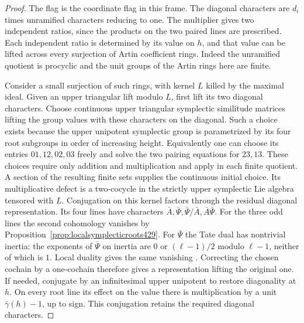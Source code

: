 \documentclass[a4paper,11pt]{article}
\theoremstyle{definition}
\theoremstyle{remark}
\numberwithin{equation}{section}
\begin{document}
\begin{proof}
The flag is the coordinate flag in this frame. The diagonal
characters are \(d_i\) times unramified characters reducing to one.
The multiplier gives two independent ratios, since the products
on the two paired lines are prescribed. Each independent ratio is
determined by its value on \(h\), and that value can be lifted across
every surjection of Artin coefficient rings. Indeed the unramified
quotient is procyclic and the unit groups of the Artin rings here
are finite.

Consider a small surjection of such rings, with kernel \(L\) killed
by the maximal ideal. Given an upper triangular lift modulo \(L\),
first lift its two diagonal characters. Choose continuous upper
triangular symplectic similitude matrices lifting the group values
with these characters on the diagonal. Such a choice exists because
the upper unipotent symplectic group is parametrized by its four
root subgroups in order of increasing height. Equivalently one can
choose its entries \(01,12,02,03\) freely and solve the two pairing
equations for \(23,13\). These choices require only addition and
multiplication and apply in each finite quotient. A section of the
resulting finite sets supplies the continuous initial choice.
Its multiplicative defect is a two-cocycle in the strictly upper
symplectic Lie algebra tensored with \(L\). Conjugation on this
kernel factors through the residual diagonal representation.
Its four lines have characters
\(\bar A,\bar\Psi,\bar\Psi/\bar A,\bar A\bar\Psi\).
For the three odd lines the second cohomology vanishes by
Proposition~\ref{prop:localsymplecticroots429}. For \(\bar\Psi\)
the Tate dual has nontrivial inertia: the exponents of \(\bar\Psi\)
on inertia are \(0\) or \((\ell-1)/2\) modulo \(\ell-1\), neither of
which is \(1\). Local duality gives the same vanishing
\cite{IX-VII-V-milne98}. Correcting the chosen cochain by a one-cochain
therefore gives a representation lifting the original one. If
needed, conjugate by an infinitesimal upper unipotent to restore
diagonality at \(h\). On every root line its effect on the value
there is multiplication by a unit \(\bar\gamma(h)-1\), up to sign.
This conjugation retains the required diagonal characters.


\end{proof}
\end{document}
